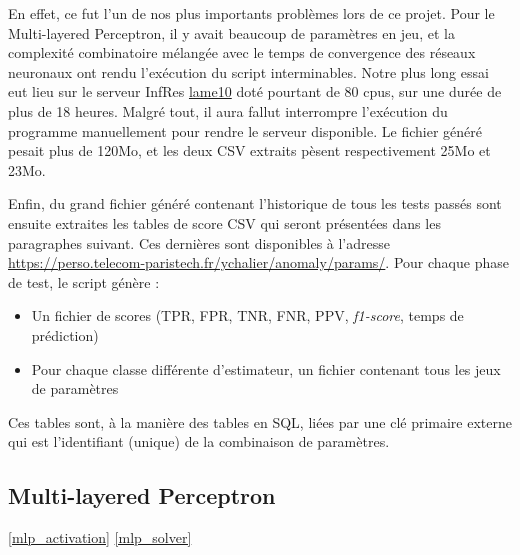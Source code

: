 \documentclass[a4paper]{report}
\begin{document}
En effet, ce fut l'un de nos plus importants problèmes lors de ce projet. Pour le Multi-layered Perceptron, il y avait beaucoup de paramètres en jeu, et la complexité combinatoire mélangée avec le temps de convergence des réseaux neuronaux ont rendu l'exécution du script interminables. Notre plus long essai eut lieu sur le serveur InfRes \href{http://lame10.enst.fr}{lame10} doté pourtant de 80 cpus, sur une durée de plus de 18 heures. Malgré tout, il aura fallut interrompre l'exécution du programme manuellement pour rendre le serveur disponible. Le fichier généré pesait plus de 120Mo, et les deux CSV extraits pèsent respectivement 25Mo et 23Mo.

Enfin, du grand fichier généré contenant l'historique de tous les tests passés sont ensuite extraites les tables de score CSV qui seront présentées dans les paragraphes suivant. Ces dernières sont disponibles à l'adresse \url{https://perso.telecom-paristech.fr/ychalier/anomaly/params/}. Pour chaque phase de test, le script génère :
\begin{itemize}
\item Un fichier de scores (TPR, FPR, TNR, FNR, PPV, \emph{f1-score}, temps de prédiction)
\item Pour chaque classe différente d'estimateur, un fichier contenant tous les jeux de paramètres
\end{itemize}
Ces tables sont, à la manière des tables en SQL, liées par une clé primaire externe qui est l'identifiant (unique) de la combinaison de paramètres.

\subsection{Multi-layered Perceptron}

\ref{mlp_activation} \ref{mlp_solver}
\end{document}
